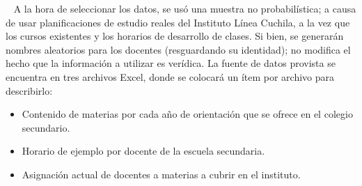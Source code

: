 \ \newline
\normalsize{ \indent
A la hora de seleccionar los datos, se usó una
muestra no probabilística; a causa de usar
planificaciones de estudio reales del Instituto
Línea Cuchila, a la vez que los cursos existentes
y los horarios de desarrollo de clases. Si bien,
se generarán nombres aleatorios para los
docentes (resguardando su identidad); no modifica
el hecho que la información a utilizar es verídica.
}
\newline
\normalsize{ \indent
La fuente de datos provista se encuentra en tres
archivos Excel, donde se colocará un ítem por
archivo para describirlo:
}
\begin{itemize}
  \item Contenido de materias por cada año de
  orientación que se ofrece en el colegio
  secundario.
  \item Horario de ejemplo por docente de la
  escuela secundaria.
  \item Asignación actual de docentes a
  materias a cubrir en el instituto.
\end{itemize}
